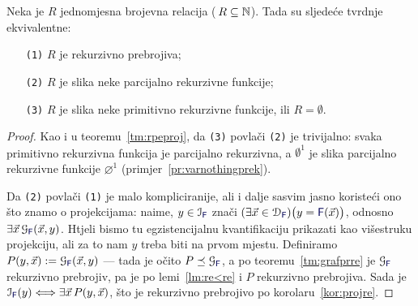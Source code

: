 \begin{teorem}
Neka je $R$ jednomjesna brojevna relacija (\,$R\subseteq{\mathbb N}$). Tada su sljedeće tvrdnje ekvivalentne:
\begin{enumerate}
    \item[\texttt{\textup{(1)}}] $R$ je rekurzivno prebrojiva;
    \item[\texttt{\textup{(2)}}] $R$ je slika neke parcijalno rekurzivne funkcije;
    \item[\texttt{\textup{(3)}}] $R$ je slika neke primitivno rekurzivne funkcije, ili $R=\emptyset$.
\end{enumerate}
\end{teorem}
\begin{proof}
Kao i u teoremu~\ref{tm:rpeproj}, da \texttt{(3)} povlači \texttt{(2)} je trivijalno: svaka primitivno rekurzivna funkcija je parcijalno rekurzivna, a $\emptyset^1$ je slika parcijalno rekurzivne funkcije $\varnothing^1$ (primjer~\ref{pr:varnothingprek}).

Da \texttt{(2)} povlači \texttt{(1)} je malo kompliciranije, ali i dalje sasvim jasno koristeći ono što znamo o projekcijama: naime, $y\in\im{\f F}$ znači $(\exists\vec x\in\dom{\f F})\bigl(y=\f F(\vec x)\bigr)$, odnosno $\exists\vec x\,\graf{\f F}(\vec x,y)$. Htjeli bismo tu egzistencijalnu kvantifikaciju prikazati kao višestruku projekciju, ali za to nam $y$ treba biti na prvom mjestu. Definiramo $P(y,\vec x):=\graf{\f F}(\vec x,y)$ --- tada je očito $P\preceq\graf{\f F}$, a po teoremu~\ref{tm:grafprre} je $\graf{\f F}$ rekurzivno prebrojiv, pa je po lemi~\ref{lm:re<re} i $P$ rekurzivno prebrojiva. Sada je $\im{\f F}(y)\Longleftrightarrow\exists\vec x\,P(y,\vec x)$, što je rekurzivno prebrojivo po korolaru~\ref{kor:projre}.


\end{proof}
